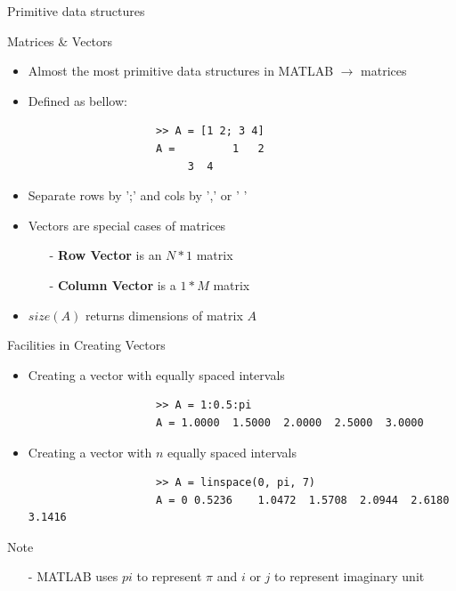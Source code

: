 \documentclass{beamer}
\begin{document}
\begin{frame}[fragile]{Primitive data structures}
	\begin{block}{Matrices \& Vectors}
		\begin{itemize}
			\item Almost the most primitive data structures in MATLAB $\rightarrow$ matrices
			\item Defined as bellow:
			\java
				\begin{lstlisting}
	 				>> A = [1 2; 3 4]
	 				A = 		1	2 
	 				     3	4
				\end{lstlisting}
			\item Separate rows by ';' and cols by ',' or ' '
			\item Vectors are special cases of matrices
				\begin{itemize}
					\item [-]\textbf{Row Vector} is an $N*1$ matrix
					\item [-]\textbf{Column Vector} is a $1*M$ matrix
				\end{itemize}
			\item $size(A)$ returns dimensions of matrix $A$
		\end{itemize}
	\end{block}
\end{frame}


\begin{frame}[fragile]{Facilities in Creating Vectors}
	\begin{block}{}
		\begin{itemize}
			\item Creating a vector with equally spaced intervals
			\java
				\begin{lstlisting}
					>> A = 1:0.5:pi
					A =	1.0000	1.5000	2.0000	2.5000	3.0000
				\end{lstlisting}
			\item Creating a vector with $n$ equally spaced intervals
			\java
				\begin{lstlisting}
					>> A = linspace(0, pi, 7)
					A =	0 0.5236	1.0472	1.5708	2.0944	2.6180	3.1416
				\end{lstlisting}
		\end{itemize}
	\end{block}
	\begin{alertblock}{Note}
		\begin{itemize}
			\item [-] MATLAB uses $pi$ to represent $\pi$ and $i$ or $j$ to represent imaginary unit
		\end{itemize}
	\end{alertblock}
\end{frame}
\end{document}
